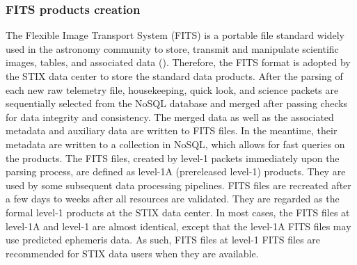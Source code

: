 \documentclass[referee]{aa} %
\begin{document}
\subsubsection{FITS products creation}
The Flexible Image Transport System (FITS) is a portable file standard widely used in the astronomy community to store, transmit and manipulate scientific images, tables, and associated data (\cite{fits}).  
Therefore, the FITS format is adopted by the STIX data center to store the standard data products. 
After the parsing of each new raw telemetry file, housekeeping, quick look, and science packets are sequentially selected from the NoSQL database and merged after passing checks for data integrity and consistency.  The merged data as well as the associated metadata and auxiliary data are written to FITS files.  In the meantime, their metadata are written to a collection in NoSQL, which allows for fast queries on the products. The FITS files, created by level-1 packets immediately upon the parsing process, are defined as level-1A (prereleased level-1) products.  They are used by some subsequent data processing pipelines.  
FITS files are recreated after a few days to weeks after all resources are validated.
They are regarded as the formal level-1 products at the STIX data center. 
In most cases, the FITS files at level-1A and level-1 are almost identical, except that the level-1A FITS files may use predicted ephemeris data. As such, FITS files at level-1 FITS files are recommended for STIX data users when they are available. 
\end{document}
